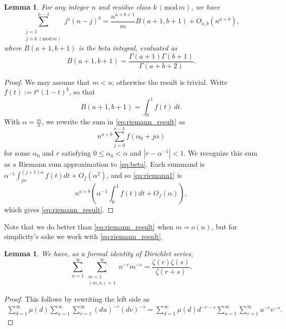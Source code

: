 \documentclass[12pt]{amsart}
\newtheorem{lemma}[theorem]{Lemma}
\numberwithin{equation}{section}
\numberwithin{theorem}{section}
\renewcommand{\pmod}[1]{\,\left(\mathrm{mod}\,#1\right)}
\begin{document}
\begin{lemma}\label{lem:riemann_sum}
For any integer $n$ and residue class $k \pmod{m}$, we have
\begin{equation}\label{eq:riemann_result}
\sum_{\substack{j = 1 \\ j \equiv k \pmod m}}^{n - 1} j^a (n - j)^b = \frac{n^{a + b + 1}}{m} B(a + 1, b + 1) + O_{a, b}\left(n^{a + b} \right),
\end{equation}
where $B(a+1,b+1)$ is the beta integral, evaluated as
\[
B(a+1,b+1) = \frac{\Gamma(a+1)\Gamma(b+1)}{\Gamma(a+b+2)}.
\]
\end{lemma}
\begin{proof} We may assume that $m < n$; otherwise the result is trivial.
Write $f(t) := t^a (1 - t)^b$, so that
\begin{equation}\label{eq:beta}
B(a+1,b+1) = \int_0^1 f(t)\,dt.
\end{equation}
With $\alpha = \frac{m}{n}$, we rewrite the sum in \eqref{eq:riemann_result} as
\begin{equation}\label{eq:riemann1}
n^{a + b} \sum_{j = 0}^{r-1} f\left(\alpha_0 + j\alpha\right)
\end{equation}
for some $\alpha_0$ and $r$ satisfying $0 \leq \alpha_0 < \alpha$ and $\left| r - \alpha^{-1} \right| < 1$.
We recognize this sum as a Riemann sum approximation to \eqref{eq:beta}.  Each summand is
$\alpha^{-1} \int_{j\alpha}^{(j + 1) \alpha} f(t) dt + O_f(\alpha^2)$, and so \eqref{eq:riemann1} is
\[
n^{a + b} \left( \alpha^{-1} \int_0^1 f(t) dt + O_f(\alpha) \right),
\]
which gives \eqref{eq:riemann_result}.
\end{proof}
Note that we do better than \eqref{eq:riemann_result} when $m = o(n)$, but for simplicity's sake we work with \eqref{eq:riemann_result}.

\begin{lemma}\label{lem:dir_identity}
We have, as a formal identity of Dirichlet series,
\[
\sum_{n = 1}^{\infty} \sum_{\substack{m = 1 \\ (m, n) = 1}}^{\infty}
n^{-r} m^{-s} =
\frac{\zeta(r) \zeta(s)}{\zeta(r + s)}.
\]
\end{lemma}
\begin{proof}
This follows by rewriting the left side as
\begin{align*}
\sum_{d = 1}^{\infty} \mu(d) \sum_{u = 1}^{\infty} \sum_{v = 1}^{\infty}
(du)^{-r} (dv)^{-s}
= 
\sum_{d = 1}^{\infty} \mu(d) d^{-r- s} \sum_{u = 1}^{\infty} \sum_{v = 1}^{\infty}
u^{-r} v^{-s}.
\end{align*}
\end{proof}
\end{document}
